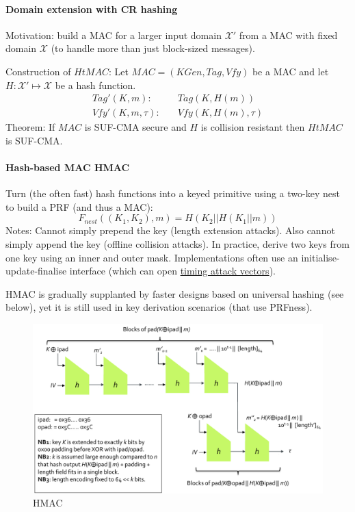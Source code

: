 \paragraph{Domain extension with CR hashing}
Motivation: build a MAC for a larger input domain $\mathcal{X}'$ from a MAC with fixed domain $\mathcal{X}$ (to handle more than just block-sized messages).

Construction of $HtMAC$:
Let $MAC=(KGen, Tag, Vfy)$ be a MAC and let $H: \mathcal{X}' \mapsto \mathcal{X}$ be a hash function.
\begin{align*}
Tag'(K, m):& \quad Tag(K, H(m)) \\
Vfy'(K, m, \tau):& \quad Vfy(K, H(m), \tau)
\end{align*}
%
Theorem:
If $MAC$ is SUF-CMA secure and $H$ is collision resistant then $HtMAC$ is SUF-CMA.

\paragraph{Hash-based MAC HMAC}
Turn (the often fast) hash functions into a keyed primitive using a two-key nest to build a PRF (and thus a MAC):
$$
F_{nest}((K_1, K_2), m) = H(K_2 || H(K_1||m))
$$
Notes:
Cannot simply prepend the key (length extension attacks).
Also cannot simply append the key (offline collision attacks).
In practice, derive two keys from one key using an inner and outer mask.
Implementations often use an initialise-update-finalise interface (which can open \href{https://eprint.iacr.org/2015/1129}{timing attack vectors}).

HMAC is gradually supplanted by faster designs based on universal hashing (see below), yet it is still used in key derivation scenarios (that use PRFness).

\begin{figure}[h]
    \centering
	\includegraphics[scale=0.45]{images/hmac.png}
    \caption{HMAC}
    \label{fig:hmac}
\end{figure}

